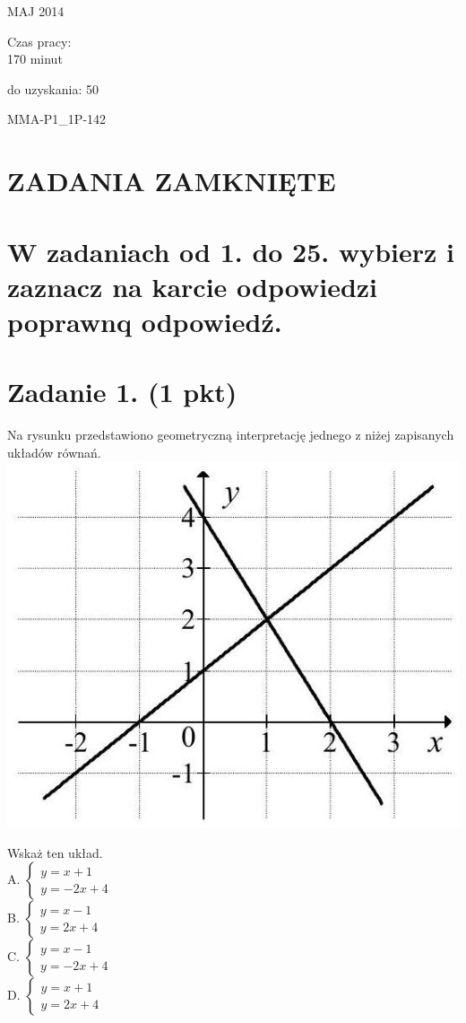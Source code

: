\documentclass[10pt]{article}
\begin{document}
MAJ 2014

Czas pracy:\\
170 minut

do uzyskania: 50

MMA-P1\_1P-142

\section*{ZADANIA ZAMKNIĘTE}
\section*{W zadaniach od 1. do 25. wybierz i zaznacz na karcie odpowiedzi poprawnq odpowiedź.}
\section*{Zadanie 1. (1 pkt)}
Na rysunku przedstawiono geometryczną interpretację jednego z niżej zapisanych układów równań.\\
\includegraphics[max width=\textwidth, center]{2024_11_21_0c267759828927e3a26dg-02}

Wskaż ten układ.\\
A. \(\left\{\begin{array}{l}y=x+1 \\ y=-2 x+4\end{array}\right.\)\\
B. \(\left\{\begin{array}{l}y=x-1 \\ y=2 x+4\end{array}\right.\)\\
C. \(\left\{\begin{array}{l}y=x-1 \\ y=-2 x+4\end{array}\right.\)\\
D. \(\left\{\begin{array}{l}y=x+1 \\ y=2 x+4\end{array}\right.\)
\end{document}
